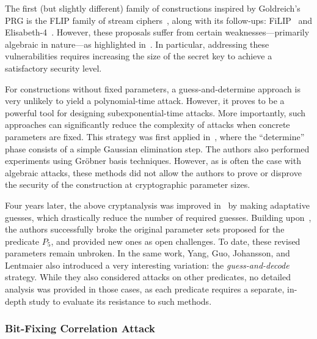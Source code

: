 The first (but slightly different) family of constructions inspired by Goldreich's PRG is the {\sf FLIP} family of stream ciphers~\cite{EC:MJSC16}, along with its follow-ups: {\sf FiLIP}~\cite{INDOCRYPT:MCJS19, INDOCRYPT:HofMeaRic20} and {\sf Elisabeth-4}~\cite{INDOCRYPT:HofMeaSta23}. However, these proposals suffer from certain weaknesses—primarily algebraic in nature—as highlighted in~\cite{C:DuvLalRot16, AC:GBJR23}. In particular, addressing these vulnerabilities requires increasing the size of the secret key to achieve a satisfactory security level.

For constructions without fixed parameters, a guess-and-determine approach is very unlikely to yield a polynomial-time attack. However, it proves to be a powerful tool for designing subexponential-time attacks. More importantly, such approaches can significantly reduce the complexity of attacks when concrete parameters are fixed. This strategy was first applied in~\cite{AC:CDMRR18}, where the “determine” phase consists of a simple Gaussian elimination step. The authors also performed experiments using Gröbner basis techniques. However, as is often the case with algebraic attacks, these methods did not allow the authors to prove or disprove the security of the construction at cryptographic parameter sizes.

Four years later, the above cryptanalysis was improved in~\cite{DBLP:journals/tit/YangGJL22} by making adaptative guesses, which drastically reduce the number of required guesses. Building upon~\cite{AC:CDMRR18}, the authors successfully broke the original parameter sets proposed for the predicate $P_5$, and provided new ones as open challenges. To date, these revised parameters remain unbroken.
In the same work, Yang, Guo, Johansson, and Lentmaier also introduced a very interesting variation: the \emph{guess-and-decode} strategy. While they also considered attacks on other predicates, no detailed analysis was provided in those cases, as each predicate requires a separate, in-depth study to evaluate its resistance to such methods.


\subsubsection{Bit-Fixing Correlation Attack}

